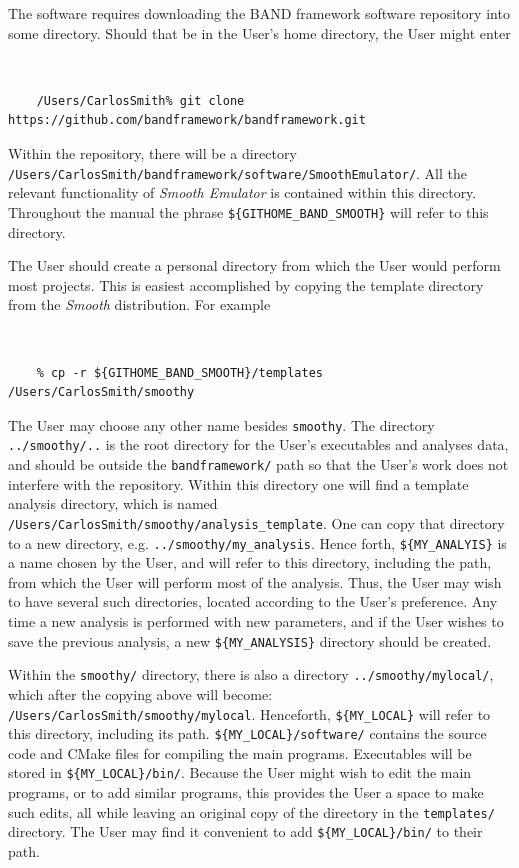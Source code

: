 \documentclass[UserManual.tex]{subfiles}
\begin{document}
The software requires downloading the BAND framework software repository into some directory. Should that be in the User's home directory, the User might enter
{\tt 
\begin{verbatim}
    /Users/CarlosSmith% git clone https://github.com/bandframework/bandframework.git
\end{verbatim}
}
Within the repository, there will be a directory\\{\tt /Users/CarlosSmith/bandframework/software/SmoothEmulator/}. All the relevant functionality of {\it Smooth Emulator} is contained within this directory. Throughout the manual the phrase {\tt \$\{GITHOME\_BAND\_SMOOTH\}} will refer to this directory. 

The User should create a personal directory from which the User would perform most projects. This is easiest accomplished by copying the template directory from the {\it Smooth} distribution. For example
{\tt
\begin{verbatim}
    % cp -r ${GITHOME_BAND_SMOOTH}/templates /Users/CarlosSmith/smoothy
\end{verbatim}
}
The User may choose any other name besides {\tt smoothy}. The directory {\tt ../smoothy/..} is the root directory for the User's executables and analyses data, and should be outside the {\tt bandframework/} path so that the User's work does not interfere with the repository. Within this directory one will find a template analysis directory, which is named  {\tt /Users/CarlosSmith/smoothy/analysis\_template}. One can copy that directory to a new directory, e.g. {\tt ../smoothy/my\_analysis}.
Hence forth, {\tt \$\{MY\_ANALYIS\}} is a name chosen by the User, and will refer to this directory, including the path, from which the User will perform most of the analysis. Thus, the User may wish to have several such directories, located according to the User's preference. Any time a new analysis is performed with new parameters, and if the User wishes to save the previous analysis, a new {\tt \$\{MY\_ANALYSIS\}} directory should be created. 

Within the {\tt smoothy/} directory, there is also a directory {\tt ../smoothy/mylocal/}, which after the copying above will become: {\tt /Users/CarlosSmith/smoothy/mylocal}. Henceforth, {\tt\$\{MY\_LOCAL\}} will refer to this directory, including its path. {\tt\$\{MY\_LOCAL\}/software/} contains the source code and CMake files for compiling the main programs. Executables will be stored in {\tt\$\{MY\_LOCAL\}/bin/}. Because the User might wish to edit the main programs, or to add similar programs, this provides the User a space to make such edits, all while leaving an original copy of the directory in the {\tt templates/} directory. The User may find it convenient to add {\tt \$\{MY\_LOCAL\}/bin/} to their path.
\end{document}

